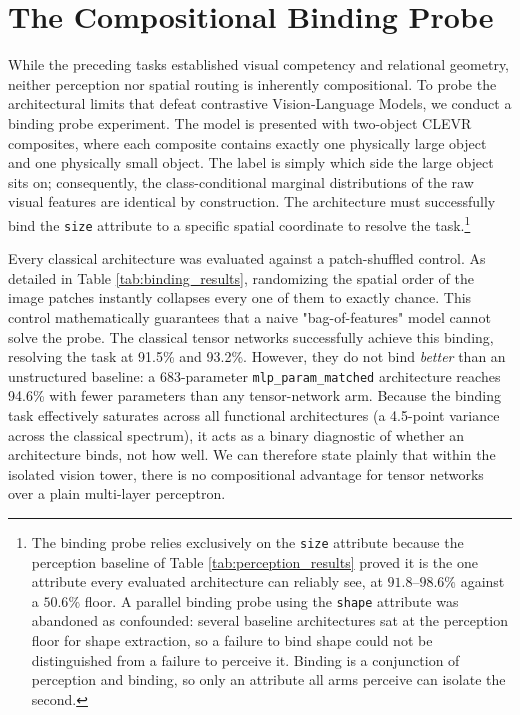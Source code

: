 \documentclass[12pt, a4paper, oneside]{report}
\begin{document}
\section{The Compositional Binding Probe}
\label{sec:binding_probe}

While the preceding tasks established visual competency and relational geometry, neither perception nor spatial routing is inherently compositional. To probe the architectural limits that defeat contrastive Vision-Language Models, we conduct a binding probe experiment. The model is presented with two-object CLEVR composites, where each composite contains exactly one physically large object and one physically small object. The label is simply which side the large object sits on; consequently, the class-conditional marginal distributions of the raw visual features are identical by construction. The architecture must successfully bind the \texttt{size} attribute to a specific spatial coordinate to resolve the task.\footnote{The binding probe relies exclusively on the \texttt{size} attribute because the perception baseline of Table \ref{tab:perception_results} proved it is the one attribute every evaluated architecture can reliably see, at $91.8$--$98.6\%$ against a $50.6\%$ floor. A parallel binding probe using the \texttt{shape} attribute was abandoned as confounded: several baseline architectures sat at the perception floor for shape extraction, so a failure to bind shape could not be distinguished from a failure to perceive it. Binding is a conjunction of perception and binding, so only an attribute all arms perceive can isolate the second.}

Every classical architecture was evaluated against a patch-shuffled control. As detailed in Table \ref{tab:binding_results}, randomizing the spatial order of the image patches instantly collapses every one of them to exactly chance. This control mathematically guarantees that a naive "bag-of-features" model cannot solve the probe. The classical tensor networks successfully achieve this binding, resolving the task at 91.5\% and 93.2\%. However, they do not bind \emph{better} than an unstructured baseline: a 683-parameter \texttt{mlp\_param\_matched} architecture reaches 94.6\% with fewer parameters than any tensor-network arm. Because the binding task effectively saturates across all functional architectures (a 4.5-point variance across the classical spectrum), it acts as a binary diagnostic of whether an architecture binds, not how well. We can therefore state plainly that within the isolated vision tower, there is no compositional advantage for tensor networks over a plain multi-layer perceptron.
\end{document}

